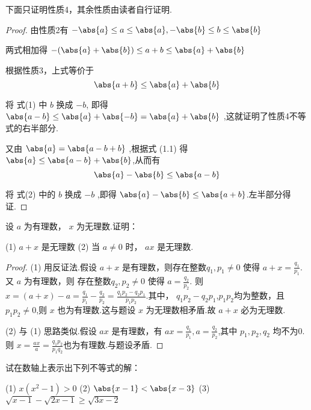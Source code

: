下面只证明性质4，其余性质由读者自行证明.

\begin{proof}
    由性质2有 \qquad $-\abs{a} \le a \le \abs{a},-\abs{b} \le b \le \abs{b}$

    两式相加得 \qquad $- (\abs{a}+\abs{b}) \le a+b \le \abs{a}+\abs{b}$

    根据性质3，上式等价于
    \begin{equation}
        \abs{a+b} \le \abs{a}+\abs{b}
    \end{equation}
    
    将 式(1) 中 $b$ 换成 $-b$, 即得 $\abs{a-b} \le \abs{a}+\abs{-b}=\abs{a}+\abs{b}$ ,这就证明了性质4不等式的右半部分.

    又由 $\abs{a} = \abs{a-b+b}$ ,根据式 (1.1) 得 $ \abs{a} \le \abs{a-b}+\abs{b}$,从而有
    \begin{equation}
        \abs{a} - \abs{b} \le \abs{a-b}
    \end{equation}

    将 式(2) 中的 $b$ 换成 $-b$ ,即得 $\abs{a} - \abs{b} \le \abs{a + b}$.左半部分得证.
\end{proof}

\homework

\begin{practice}
    设 $a$ 为有理数， $x$ 为无理数.证明：
    
   (1) $a+x$ 是无理数 \quad (2) 当 $a\ne 0$ 时， $ax$ 是无理数.
\end{practice}

\begin{proof}
    (1) 用反证法.假设 $a+x$ 是有理数，则存在整数$q_1,p_1\ne 0$ 使得 $a+x = \frac{q_1}{p_1}$. 又 $a$ 为有理数，则 存在整数$q_2,p_2\ne 0$ 使得 $a= \frac{q_2}{p_2}$.
    则 $x=(a+x)-a=\frac{q_1}{p_1}-\frac{q_2}{p_2}=\frac{q_1p_2-q_2p_1}{p_1p_2}$.其中， $q_1p_2-q_2p_1$,$p_1p_2$均为整数，且$p_1p_2\ne 0$,则 $x$ 也为有理数.这与题设 $x$ 为无理数相矛盾.故 $a+x$ 必为无理数.

    (2) 与 (1) 思路类似.假设 $ax$ 是有理数，有 $ax=\frac{q_1}{p_1},a=\frac{q_2}{p_2}$,其中 $p_1,p_2,q_2$ 均不为0. 则 $x=\frac{ax}{a}=\frac{q_1p_2}{p_1q_2}$也为有理数.与题设矛盾.
\end{proof}

\begin{practice}
    试在数轴上表示出下列不等式的解：
    
    (1) $x(x^2-1)>0$ \quad (2) $\abs{x-1} < \abs{x-3}$ \quad (3)$\sqrt{x-1}-\sqrt{2x-1} \ge \sqrt{3x-2}$
\end{practice}

